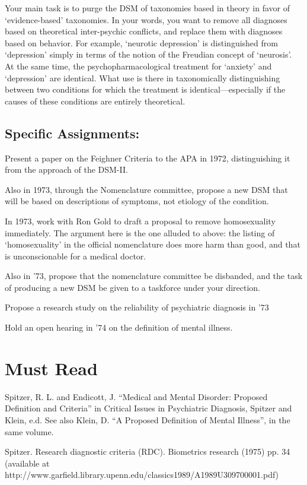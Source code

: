 \begin{refsection}
Your main task is to purge the DSM of taxonomies based in theory in favor of `evidence-based' taxonomies. In your words, you want to remove all diagnoses based on theoretical inter-psychic conflicts, and replace them with diagnoses based on behavior. For example, `neurotic depression' is distinguished from `depression' simply in terms of the notion of the Freudian concept of `neurosis'. At the same time, the psychopharmacological treatment for `anxiety' and `depression' are identical. What use is there in taxonomically distinguishing between two conditions for which the treatment is identical---especially if the causes of these conditions are entirely theoretical.

\subsection{Specific Assignments:}
\label{specificassignments:}

Present a paper on the Feighner Criteria to the APA in 1972, distinguishing it from the approach of the DSM-II.

Also in 1973, through the Nomenclature committee, propose a new DSM that will be based on descriptions of symptoms, not etiology of the condition.

In 1973, work with Ron Gold to draft a proposal to remove homosexuality immediately. The argument here is the one alluded to above: the listing of `homosexuality' in the official nomenclature does more harm than good, and that is unconscionable for a medical doctor.

Also in '73, propose that the nomenclature committee be disbanded, and the task of producing a new DSM be given to a taskforce under your direction.

Propose a research study on the reliability of psychiatric diagnosis in '73

Hold an open hearing in '74 on the definition of mental illness.

\section{Must Read}
\label{mustread}

Spitzer, R. L. and Endicott, J. ``Medical and Mental Disorder: Proposed Definition and Criteria'' in Critical Issues in Psychiatric Diagnosis, Spitzer and Klein, e.d. See also Klein, D. ``A Proposed Definition of Mental Illness'', in the same volume.

Spitzer. Research diagnostic criteria (RDC). Biometrics research (1975) pp. 34 (available at http:\slash \slash www.garfield.library.upenn.edu\slash classics1989\slash A1989U309700001.pdf)


\end{refsection}
